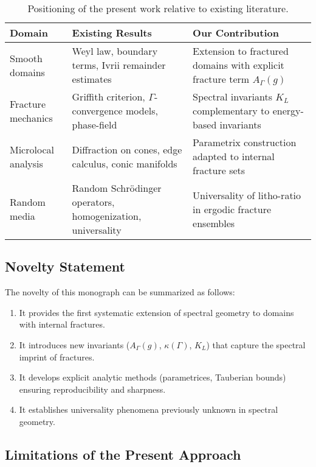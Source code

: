 \begin{table}[h]
\centering
\begin{tabular}{|p{3.5cm}|p{5cm}|p{5cm}|}
\hline
\textbf{Domain} & \textbf{Existing Results} & \textbf{Our Contribution} \\
\hline
Smooth domains & Weyl law, boundary terms,
  Ivrii remainder estimates & Extension to fractured domains with explicit
  fracture term $A_\Gamma(g)$ \\
\hline
Fracture mechanics & Griffith criterion,
  $\Gamma$-convergence models, phase-field &
  Spectral invariants $K_L$ complementary to energy-based invariants \\
\hline
Microlocal analysis & Diffraction on cones,
  edge calculus, conic manifolds & Parametrix construction adapted to
  internal fracture sets \\
\hline
Random media & Random Schrödinger operators,
  homogenization, universality & Universality of litho-ratio in ergodic
  fracture ensembles \\
\hline
\end{tabular}
\caption{Positioning of the present work relative to existing literature.}
\end{table}

\subsection{Novelty Statement}

The novelty of this monograph can be summarized as follows:

\begin{enumerate}
  \item It provides the first systematic extension of spectral geometry to
  domains with internal fractures.
  \item It introduces new invariants ($A_\Gamma(g)$, $\kappa(\Gamma)$,
  $K_L$) that capture the spectral imprint of fractures.
  \item It develops explicit analytic methods (parametrices, Tauberian bounds)
  ensuring reproducibility and sharpness.
  \item It establishes universality phenomena previously unknown in spectral
  geometry.
\end{enumerate}

\subsection{Limitations of the Present Approach}

